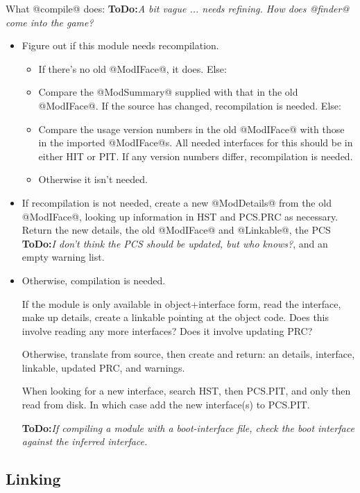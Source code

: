 \documentclass[11pt]{article}
\newcommand{\ToDo}[1]{{{\bf ToDo:}\sl #1}}
\begin{document}
What @compile@ does: \ToDo{A bit vague ... needs refining.  How does
                           @finder@ come into the game?}
\begin{itemize}
\item Figure out if this module needs recompilation.
   \begin{itemize}
   \item If there's no old @ModIFace@, it does.  Else:
   \item Compare the @ModSummary@ supplied with that in the
         old @ModIFace@.  If the source has changed, recompilation
         is needed.  Else:
   \item Compare the usage version numbers in the old @ModIFace@ with
         those in the imported @ModIFace@s.  All needed interfaces
         for this should be in either HIT or PIT.  If any version
         numbers differ, recompilation is needed.
   \item Otherwise it isn't needed.   
   \end{itemize}

\item
   If recompilation is not needed, create a new @ModDetails@ from the
   old @ModIFace@, looking up information in HST and PCS.PRC as necessary.
   Return the new details, the old @ModIFace@ and @Linkable@, the PCS
   \ToDo{I don't think the PCS should be updated, but who knows?}, and
   an empty warning list.

\item
   Otherwise, compilation is needed.  

   If the module is only available in object+interface form, read the
   interface, make up details, create a linkable pointing at the
   object code.  Does this involve reading any more interfaces?  Does
   it involve updating PRC?
   
   Otherwise, translate from source, then create and return: an
   details, interface, linkable, updated PRC, and warnings.

   When looking for a new interface, search HST, then PCS.PIT, and only
   then read from disk.  In which case add the new interface(s) to
   PCS.PIT.  
   
   \ToDo{If compiling a module with a boot-interface file, check the 
   boot interface against the inferred interface.}
\end{itemize}



\subsection{Linking}
\label{sec:linker}
\end{document}
